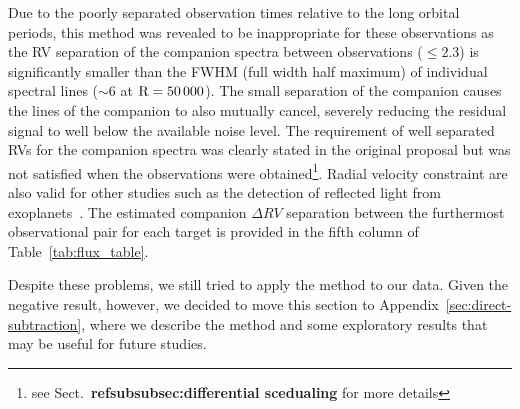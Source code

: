 Due to the poorly separated observation times relative to the long orbital periods, this method was revealed to be inappropriate for these observations as the RV separation of the companion spectra between observations (\(\le 2.3\)\kmps{}) is significantly smaller than the FWHM (full width half maximum) of individual spectral lines (\(\sim\)6\kmps{} at \(\rm R=50\,000\)).  The small separation of the companion causes the lines of the companion to also mutually cancel, severely reducing the residual signal to well below the available noise level. The requirement of well separated RVs for the companion spectra was clearly stated in the original proposal but was not satisfied when the observations were obtained\footnote{see Sect.~\textbf{ref{subsubsec:differential scedualing}} for more details}. Radial velocity constraint are also valid for other studies such as the detection of reflected light from exoplanets~\cite{martins_evidence_2015}. The estimated companion \(\Delta RV\) separation between the furthermost observational pair for each target is provided in the fifth column of Table~\ref{tab:flux_table}.

Despite these problems, we still tried to apply the method to our data. Given the negative result, however, we decided to move this section to Appendix~\ref{sec:direct-subtraction}, where we describe the method and some exploratory results that may be useful for future studies.



